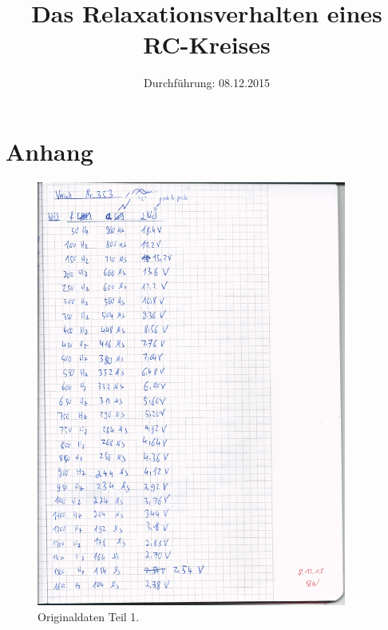 

\subject{Versuchsprotokoll zum Versuch Nr. 353}
\title{Das Relaxationsverhalten eines RC-Kreises}
\date{
  Durchführung: 08.12.2015
}



\maketitle
\newpage






\section{Anhang}
\begin{figure}[H]
  \centering
  \includegraphics[height=14cm]{original1.png}
  \caption{Originaldaten Teil 1.}
  \label{fig:original1}
\end{figure}

